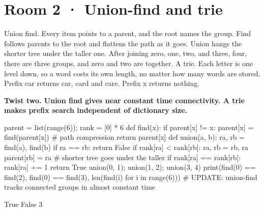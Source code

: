 \documentclass[11pt,a4paper]{report}
\begin{document}
\section*{Room 2 · Union-find and trie}
Union find. Every item points to a parent, and the root names the group. Find follows parents to the root and flattens the path as it goes. Union hangs the shorter tree under the taller one. After joining zero, one, two, and three, four, there are three groups, and zero and two are together. A trie. Each letter is one level down, so a word costs its own length, no matter how many words are stored. Prefix car returns car, card and care. Prefix x returns nothing.
\begin{tcolorbox}[colback=yellow!12,colframe=orange!70!black,boxrule=0.4pt,left=4pt,right=4pt,top=2pt,bottom=2pt]\textbf{Twist two. Union find gives near constant time connectivity. A trie makes prefix search independent of dictionary size.}\end{tcolorbox}
\begin{Code}
parent = list(range(6)); rank = [0] * 6
def find(x):
    if parent[x] != x: parent[x] = find(parent[x])   # path compression
    return parent[x]
def union(a, b):
    ra, rb = find(a), find(b)
    if ra == rb: return False
    if rank[ra] < rank[rb]: ra, rb = rb, ra
    parent[rb] = ra                          # shorter tree goes under the taller
    if rank[ra] == rank[rb]: rank[ra] += 1
    return True
union(0, 1); union(1, 2); union(3, 4)
print(find(0) == find(2), find(0) == find(3), len({find(i) for i in range(6)}))
# UPDATE: union-find tracks connected groups in almost constant time
\end{Code}
\begin{Out}
True False 3
\end{Out}
\begin{Out}
\end{Out}
\end{document}
